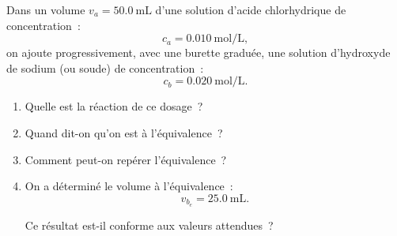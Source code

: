 Dans un volume $v_{a}=\qty{50.0}{\mL}$ d'une solution d'acide chlorhydrique de
concentration~:
\[
    c_{a}=\qty{0.010}{\mol\per\L},
\]
on ajoute progressivement, avec une burette graduée, une solution d'hydroxyde de
sodium (ou soude) de concentration~:
\[
    c_{b}=\qty{0.020}{\mol\per\L}.
\]
\begin{enumerate}
    \item Quelle est la réaction de ce dosage~?
    \item Quand dit-on qu'on est à l'équivalence~?
    \item Comment peut-on repérer l'équivalence~?
    \item On a déterminé le volume à l'équivalence~:
          \[
              v_{b_{e}}=\qty{25.0}{\mL}.
          \]

          Ce résultat est-il conforme aux valeurs attendues~?
\end{enumerate}

